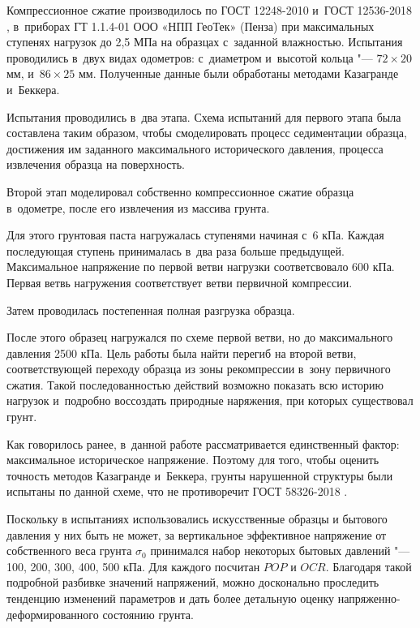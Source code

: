 Компрессионное сжатие производилось по ГОСТ 12248-2010 \cite{gost12248} и~ГОСТ 12536-2018 \cite{gost12536}, в~приборах ГТ 1.1.4-01 ООО «НПП ГеоТек» (Пенза) при максимальных ступенях нагрузок до 2,5 МПа на образцах с~заданной влажностью. Испытания проводились в~двух видах одометров: с~диаметром и~высотой кольца "--- $72 \times 20$ мм, и~$86 \times 25$ мм.
Полученные данные были обработаны методами Казагранде и~Беккера. 

Испытания проводились в~два этапа.
Схема испытаний для первого этапа была составлена таким образом, чтобы смоделировать процесс седиментации образца, достижения им заданного максимального исторического давления, процесса извлечения образца на поверхность.

Второй этап моделировал собственно компрессионное сжатие образца в~одометре, после его извлечения из массива грунта.

Для этого грунтовая паста нагружалась ступенями начиная с~6 кПа.
Каждая последующая ступень принималась в~два раза больше предыдущей.
Максимальное напряжение по первой ветви нагрузки соответсвовало 600 кПа.
Первая ветвь нагружения соответствует ветви первичной компрессии.

Затем проводилась постепенная полная разгрузка образца.

После этого образец нагружался по схеме первой ветви, но до максимального давления 2500 кПа.
Цель работы была найти перегиб на второй ветви, соответствующей переходу образца из зоны рекомпрессии в~зону первичного сжатия.
Такой последованностью действий возможно показать всю историю нагрузок и~подробно воссоздать природные наряжения, при которых существовал грунт. 

Как говорилось ранее, в~данной работе рассматривается единственный фактор: максимальное историческое напряжение.
Поэтому для того, чтобы оценить точность методов Казагранде и~Беккера, грунты нарушенной структуры были испытаны по данной схеме, что не противоречит ГОСТ 58326-2018 \cite{gost58236}.

Поскольку в испытаниях использовались искусственные образцы и бытового давления у них быть не может, за вертикальное эффективное напряжение от собственного веса грунта $\sigma_0$ принимался набор некоторых бытовых давлений "--- 100, 200, 300, 400, 500 кПа.
Для каждого посчитан $POP$ и $OCR$. Благодаря такой подробной разбивке значений напряжений, можно досконально проследить тенденцию изменений параметров и дать более детальную оценку напряженно-деформированного состоянию грунта. 

